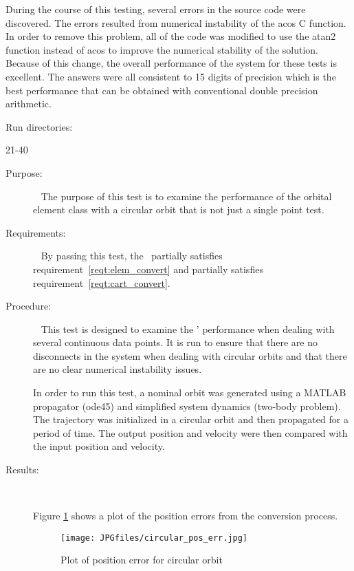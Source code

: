 \begin{description}
During the course of this testing, several errors in the source code were
discovered.  The errors resulted from numerical instability of the acos C function.
In order to remove this problem, all of the code was modified to use the atan2
function instead of acos to improve the numerical stability of the solution.
Because of this change, the overall performance of the system for these tests
is excellent.  The answers were all consistent to 15 digits of precision which
is the best performance that can be obtained with conventional double precision arithmetic.

Run directories:

21-40
\end{description}

\label{test:circ_cont_orb}
\begin{description}
\item[Purpose:] \ \newline
The purpose of this test is to examine the performance of the orbital element
class with a circular orbit that is not just a single point test.
\item[Requirements:] \ \newline
By passing this test, the \OrbitalElement\ partially satisfies
requirement~\ref{reqt:elem_convert} and partially satisfies
requirement~\ref{reqt:cart_convert}.
\item[Procedure:]\ \newline
This test is designed to examine the \OrbitalElement' performance when
dealing with several continuous data points.  It is run to ensure that there
are no disconnects in the system when dealing with circular orbits and that
there are no clear numerical instability issues.

In order to run this test, a nominal orbit was generated using a MATLAB
propagator (ode45) and simplified system dynamics (two-body problem).  The
trajectory was initialized in a circular orbit and then propagated for a period
of time.  The output position and velocity were then compared with the input
position and velocity.

\item[Results:]\ \newline

Figure \ref{circ_traj_pos_err} shows a plot of the position errors from the
conversion process.

\begin{figure}[h]
\begin{center}
\texttt{[image: JPGfiles/circular\_pos\_err.jpg]}
\caption{Plot of position error for circular orbit}
\label{circ_traj_pos_err}
\end{center}
\end{figure}


\end{description}
